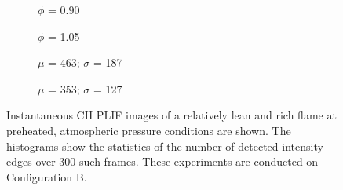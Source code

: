 \begin{figure}

\hfill
\begin{subfigure}{0.45\linewidth}
  \centering
  
  \caption{\(\phi\) = 0.90}
  \label{fig:lowEquivalenceRatioPLIFImage}
\end{subfigure}
\hfill
\begin{subfigure}{0.45\linewidth}
  \centering
  
  \caption{\(\phi\) = 1.05}
  \label{fig:highEquivalenceRatioPLIFImage}
\end{subfigure}
\hfill

\hfill
\begin{subfigure}{0.45\linewidth}
  \centering
  
  \caption{\(\mu\) = 463; \(\sigma\) = 187}
  \label{fig:lowEquivalenceRatioPLIFHistogram}
\end{subfigure}
\hfill
\begin{subfigure}{0.45\linewidth}
  \centering
  
  \caption{\(\mu\) = 353; \(\sigma\) = 127}
  \label{fig:highEquivalenceRatioPLIFHistogram}
\end{subfigure}
\hfill

\caption[Effect of equivalence ratio on the flame structure]{Instantaneous CH PLIF images of a relatively lean and rich flame at preheated, atmospheric pressure conditions are shown. The histograms show the statistics of the number of detected intensity edges over 300 such frames. These experiments are conducted on Configuration B.}

\label{fig:equivalenceRatioPLIFResults}

\end{figure}

